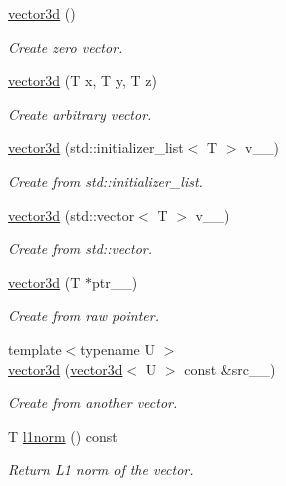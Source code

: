 \begin{DoxyCompactItemize}
\item 
\hyperlink{classgeometry3d_1_1vector3d_a9066bd5e757225eda554ab7ee1c63e6c}{vector3d} ()
\begin{DoxyCompactList}\small\item\em Create zero vector. \end{DoxyCompactList}\item 
\hyperlink{classgeometry3d_1_1vector3d_a5291e7f9a99e135d2dcc756d1c699a7c}{vector3d} (T x, T y, T z)
\begin{DoxyCompactList}\small\item\em Create arbitrary vector. \end{DoxyCompactList}\item 
\hyperlink{classgeometry3d_1_1vector3d_ac9e84834ec8a95c7b2f06b9a7ad47fa3}{vector3d} (std\+::initializer\+\_\+list$<$ T $>$ v\+\_\+\+\_\+)
\begin{DoxyCompactList}\small\item\em Create from std\+::initializer\+\_\+list. \end{DoxyCompactList}\item 
\hyperlink{classgeometry3d_1_1vector3d_a433f619f594ff165cf6f8a1abaf3b330}{vector3d} (std\+::vector$<$ T $>$ v\+\_\+\+\_\+)
\begin{DoxyCompactList}\small\item\em Create from std\+::vector. \end{DoxyCompactList}\item 
\hyperlink{classgeometry3d_1_1vector3d_af93fe90a8262cb92067b1004183df4c4}{vector3d} (T $\ast$ptr\+\_\+\+\_\+)
\begin{DoxyCompactList}\small\item\em Create from raw pointer. \end{DoxyCompactList}\item 
{\footnotesize template$<$typename U $>$ }\\\hyperlink{classgeometry3d_1_1vector3d_ac6cc1abded31795fa5ba6e4489af930f}{vector3d} (\hyperlink{classgeometry3d_1_1vector3d}{vector3d}$<$ U $>$ const \&src\+\_\+\+\_\+)
\begin{DoxyCompactList}\small\item\em Create from another vector. \end{DoxyCompactList}\item 
T \hyperlink{classgeometry3d_1_1vector3d_a4dcf4598e2ec23ac289be7d621660071}{l1norm} () const 
\begin{DoxyCompactList}\small\item\em Return L1 norm of the vector. \end{DoxyCompactList}\item 

\end{DoxyCompactItemize}
